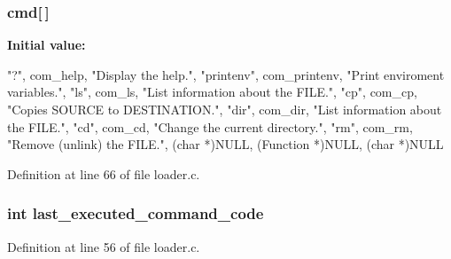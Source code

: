 \subsubsection[{cmd}]{ {\bf cmd}[$\,$]}\label{loader_8c_a305cdb24369c8c8473fec1e23b995efb}
{\bfseries Initial value:}
\begin{DoxyCode}
 {
                {"?", com_help, "Display the help."},
                {"printenv", com_printenv, "Print enviroment variables."},
                {"ls", com_ls, "List information about the FILE."},
                {"cp", com_cp, "Copies SOURCE to DESTINATION."},
                {"dir", com_dir, "List information about the FILE."},
                {"cd", com_cd, "Change the current directory."},
                {"rm", com_rm, "Remove (unlink) the FILE."},
                { (char *)NULL, (Function *)NULL, (char *)NULL }
                }
\end{DoxyCode}


Definition at line 66 of file loader.c.

\subsubsection[{last\_\-executed\_\-command\_\-code}]{\setlength{\rightskip}{0pt plus 5cm}int {\bf last\_\-executed\_\-command\_\-code}}\label{loader_8c_a6645f1aded5094e7767b3006bc16ad7e}


Definition at line 56 of file loader.c.

